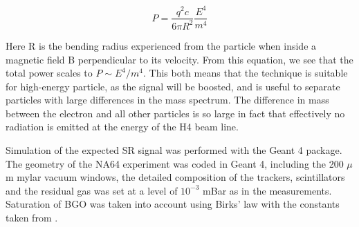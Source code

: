 \begin{equation}
  \label{eq:srd-power}
  P = \frac{q^2 c}{6 \pi R^2}\frac{E^4}{m^4}
\end{equation}

Here R is the bending radius experienced from the particle when inside a magnetic field B perpendicular to its velocity. From this equation, we see that the total power scales to $P\sim E^4/m^4$. This both means that the technique is suitable for high-energy particle, as the signal will be boosted, and is useful to separate particles with large differences in the mass spectrum. The difference in mass between the electron and all other particles is so large in fact that effectively no radiation is emitted at the energy of the H4 beam line. 

Simulation of the expected SR signal was performed with the Geant 4 package\cite{ALLISON2016186,1610988,AGOSTINELLI2003250}.
The geometry of the NA64 experiment was coded in Geant 4, including the 200 $\mu$m mylar vacuum windows, the detailed composition of the trackers, scintillators and the residual gas was set at a level of $10^{-3}$ mBar as in the measurements. Saturation of BGO was taken into account using Birks' law with the constants taken from \cite{AVDEICHIKOV2002251}.

